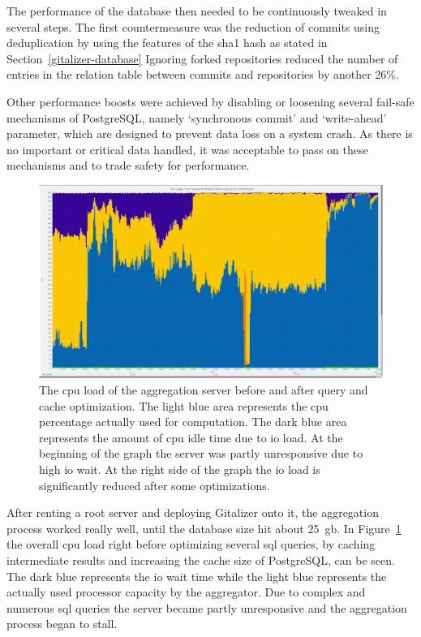 The performance of the database then needed to be continuously tweaked in several steps.
The first countermeasure was the reduction of commits using deduplication by using the features of the \ac{sha1} hash as stated in Section~\ref{gitalizer-database}
Ignoring forked repositories reduced the number of entries in the relation table between commits and repositories by another 26\%.

Other performance boosts were achieved by disabling or loosening several fail-safe mechanisms of PostgreSQL, namely `synchronous commit' and `write-ahead' parameter, which are designed to prevent data loss on a system crash.
As there is no important or critical data handled, it was acceptable to pass on these mechanisms and to trade safety for performance.

\begin{figure}[H]
\includegraphics[scale=0.22]{./graphs/server-graphs/query-refactoring}
\centering
\caption{The \ac{cpu} load of the aggregation server before and after query and cache optimization.
The light blue area represents the \ac{cpu} percentage actually used for computation.
The dark blue area represents the amount of \ac{cpu} idle time due to \ac{io} load.
At the beginning of the graph the server was partly unresponsive due to high \ac{io} wait.
At the right side of the graph the \ac{io} load is significantly reduced after some optimizations.}\label{fig:cpu-load}
\end{figure}

After renting a root server and deploying Gitalizer onto it, the aggregation process worked really well, until the database size hit about 25~\ac{gb}.
In Figure~\ref{fig:cpu-load} the overall \ac{cpu} load right before optimizing several \ac{sql} queries, by caching intermediate results and increasing the cache size of PostgreSQL, can be seen.
The dark blue represents the \ac{io} wait time while the light blue represents the actually used processor capacity by the aggregator.
Due to complex and numerous \ac{sql} queries the server became partly unresponsive and the aggregation process began to stall.

